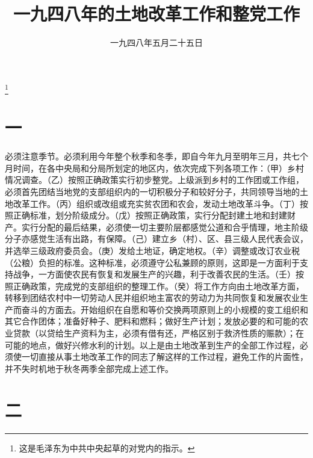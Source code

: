 
\title{一九四八年的土地改革工作和整党工作}
\date{一九四八年五月二十五日}
\thanks{这是毛泽东为中共中央起草的对党内的指示。}
\maketitle


\section*{一}

必须注意季节。必须利用今年整个秋季和冬季，即自今年九月至明年三月，共七个月时间，在各中央局和分局所划定的地区内，依次完成下列各项工作：（甲）乡村情况调查。（乙）按照正确政策实行初步整党。上级派到乡村的工作团或工作组，必须首先团结当地党的支部组织内的一切积极分子和较好分子，共同领导当地的土地改革工作。（丙）组织或改组或充实贫农团和农会，发动土地改革斗争。（丁）按照正确标准，划分阶级成分。（戊）按照正确政策，实行分配封建土地和封建财产。实行分配的最后结果，必须使一切主要阶层都感觉公道和合乎情理，地主阶级分子亦感觉生活有出路，有保障。（己）建立乡（村）、区、县三级人民代表会议，并选举三级政府委员会。（庚）发给土地证，确定地权。（辛）调整或改订农业税（公粮）负担的标准。这种标准，必须遵守公私兼顾的原则，这即是一方面利于支持战争，一方面使农民有恢复和发展生产的兴趣，利于改善农民的生活。（壬）按照正确政策，完成党的支部组织的整理工作。（癸）将工作方向由土地改革方面，转移到团结农村中一切劳动人民并组织地主富农的劳动力为共同恢复和发展农业生产而奋斗的方面去。开始组织在自愿和等价交换两项原则上的小规模的变工组织和其它合作团体；准备好种子、肥料和燃料；做好生产计划；发放必要的和可能的农业贷款（以贷给生产资料为主，必须有借有还，严格区别于救济性质的赈款）；在可能的地点，做好兴修水利的计划。以上是由土地改革到生产的全部工作过程，必须使一切直接从事土地改革工作的同志了解这样的工作过程，避免工作的片面性，并不失时机地于秋冬两季全部完成上述工作。

\section*{二}


